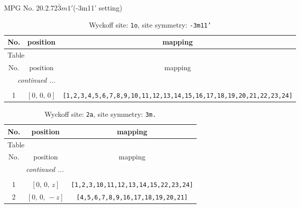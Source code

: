 \documentclass[fleqn,8pt]{jsarticle}
\begin{document}
\setcounter{MaxMatrixCols}{32}

\renewcommand{\tablename}{Table~}
\renewcommand{\figurename}{Figure~}
\begin{center}
\LARGE
MPG No. 20.2.72\quad$\bar{3}m1'$\quad(-3m11' setting)
\end{center}
\renewcommand{\arraystretch}{1.2}
\begin{longtable}{ccc}
\caption{Wyckoff site: {\tt 1o}, site symmetry: {\tt -3m11'}}
 \\
 \hline \hline
No. & position & mapping \\ \hline \endfirsthead

\multicolumn{2}{l}{\tablename\ \thetable{}} \\
 \hline \hline
No. & position & mapping \\ \hline \endhead

 \hline \hline
\multicolumn{2}{r}{\footnotesize\it continued ...} \\ \endfoot

 \hline \hline
\multicolumn{2}{r}{} \\ \endlastfoot

1 & $\left[ 0,\, 0,\, 0 \right]$ & {\tt [1,2,3,4,5,6,7,8,9,10,11,12,13,14,15,16,17,18,19,20,21,22,23,24]} \\
\end{longtable}
\renewcommand{\arraystretch}{1.2}
\begin{longtable}{ccc}
\caption{Wyckoff site: {\tt 2a}, site symmetry: {\tt 3m.}}
 \\
 \hline \hline
No. & position & mapping \\ \hline \endfirsthead

\multicolumn{2}{l}{\tablename\ \thetable{}} \\
 \hline \hline
No. & position & mapping \\ \hline \endhead

 \hline \hline
\multicolumn{2}{r}{\footnotesize\it continued ...} \\ \endfoot

 \hline \hline
\multicolumn{2}{r}{} \\ \endlastfoot

1 & $\left[ 0,\, 0,\, z \right]$ & {\tt [1,2,3,10,11,12,13,14,15,22,23,24]} \\ \hline
2 & $\left[ 0,\, 0,\, - z \right]$ & {\tt [4,5,6,7,8,9,16,17,18,19,20,21]} \\
\end{longtable}
\renewcommand{\arraystretch}{1.2}
\end{document}
